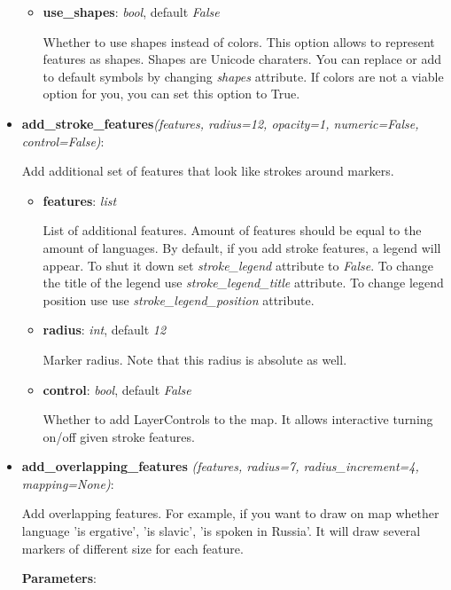\documentclass[a4paper,12pt]{article}
\begin{document}
\begin{itemize}
\begin{itemize}
  \item \textbf{use\_shapes}: \textit{bool}, default \textit{False}

  Whether to use shapes instead of colors. This option allows to represent features as shapes.
  Shapes are Unicode charaters. You can replace or add to default symbols by changing \textit{shapes} attribute.
  If colors are not a viable option for you, you can set this option to True.
  
 \end{itemize}
 
 \item \textbf{add\_stroke\_features}\textit{(features, radius=12, opacity=1, numeric=False, control=False)}:
 
 Add additional set of features that look like strokes around markers.
 
 \begin{itemize}
 \item \textbf{features}: \textit{list}
 
 List of additional features. Amount of features should be equal to the amount of languages.
 By default, if you add stroke features, a legend will appear. To shut it down set \textit{stroke_legend} attribute to \textit{False}.
 To change the title of the legend use \textit{stroke\_legend\_title} attribute.
 To change legend position use use \textit{stroke\_legend\_position} attribute.
 
 \item \textbf{radius}: \textit{int}, default \textit{12}
 
 Marker radius. Note that this radius is absolute as well.
 
 \item \textbf{control}: \textit{bool}, default \textit{False}
  
  Whether to add LayerControls to the map.
  It allows interactive turning on/off given stroke features.

 \end{itemize}
 
 \item \textbf{add\_overlapping\_features} \textit{(features, radius=7, radius\_increment=4, mapping=None)}:
 
 Add overlapping features.
 For example, if you want to draw on map whether language 'is ergative', 'is slavic', 'is spoken in Russia'.
 It will draw several markers of different size for each feature.
 
 \textbf{Parameters}:
 

\end{itemize}
\end{document}
